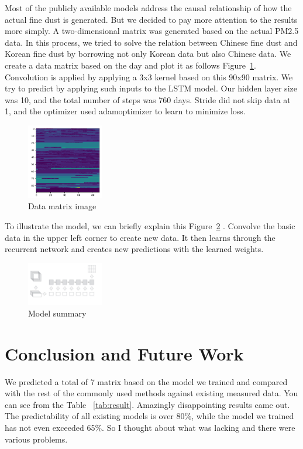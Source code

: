 \documentclass{kcc}
\begin{document}
Most of the publicly available models address the causal relationship of how the actual fine dust is generated. But we decided to pay more attention to the results more simply. A two-dimensional matrix was generated based on the actual PM2.5 data. In this process, we tried to solve the relation between Chinese fine dust and Korean fine dust by borrowing not only Korean data but also Chinese data. We create a data matrix based on the day and plot it as follows Figure~\ref{fig:data}. Convolution is applied by applying a 3x3 kernel based on this 90x90 matrix. We try to predict by applying such inputs to the LSTM model.
Our hidden layer size was 10, and the total number of steps was 760 days. Stride did not skip data at 1, and the optimizer used adamoptimizer to learn to minimize loss.
\begin{figure}[h]
  \begin{center}
     \includegraphics[width=0.3\textwidth]{fig/data.png}
  \end{center}
  \caption{Data matrix image}
  \label{fig:data}
\end{figure}

To illustrate the model, we can briefly explain this Figure~\ref{fig:model} . Convolve the basic data in the upper left corner to create new data. It then learns through the recurrent network and creates new predictions with the learned weights. 

\begin{figure}[h]
  \begin{center}
     \includegraphics[width=0.3\textwidth]{fig/model.png}
  \end{center}
  \caption{Model summary}
  \label{fig:model}
\end{figure}

\section{Conclusion and Future Work}
We predicted a total of 7 matrix based on the model we trained and compared with the rest of the commonly used methods against existing measured data.
You can see from the Table ~\ref{tab:result}. Amazingly disappointing results came out. The predictability of all existing models is over 80\%, while the model we trained has not even exceeded 65\%.
So I thought about what was lacking and there were various problems.
\end{document}
